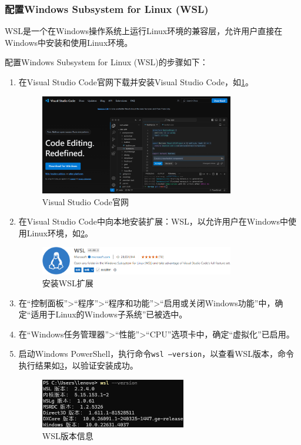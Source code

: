 \subsubsection{配置Windows Subsystem for Linux (WSL)}

WSL是一个在Windows操作系统上运行Linux环境的兼容层，允许用户直接在Windows中安装和使用Linux环境。

配置Windows Subsystem for Linux (WSL)的步骤如下：

\begin{enumerate}
    \item 在Visual Studio Code官网下载并安装Visual Studio Code，如\cref{fig:VSCodeWebsite}。
          \begin{figure}[htbp]
              \centering
              \includegraphics[width=0.8\textwidth]{figures/VSCodeWebsite.png}
              \caption{Visual Studio Code官网}
              \label{fig:VSCodeWebsite}
          \end{figure}
    \item 在Visual Studio Code中向本地安装扩展：WSL，以允许用户在Windows中使用Linux环境，如\cref{fig:ConfigureWSL}。
          \begin{figure}[htbp]
              \centering
              \includegraphics[width=0.8\textwidth]{figures/ConfigureWSL.png}
              \caption{安装WSL扩展}
              \label{fig:ConfigureWSL}
          \end{figure}
    \item 在“控制面板”>“程序”>“程序和功能”>“启用或关闭Windows功能”中，确定“适用于Linux的Windows子系统”已被选中。
    \item 在“Windows任务管理器”>“性能”>“CPU”选项卡中，确定“虚拟化”已启用。
    \item 启动Windows PowerShell，执行命令\texttt{wsl --version}，以查看WSL版本，命令执行结果如\cref{fig:WSLVersion}，以验证安装成功。
          \begin{figure}[htbp]
              \centering
              \includegraphics[width=0.6\textwidth]{figures/WSLVersion.png}
              \caption{WSL版本信息}
              \label{fig:WSLVersion}
          \end{figure}
\end{enumerate}

